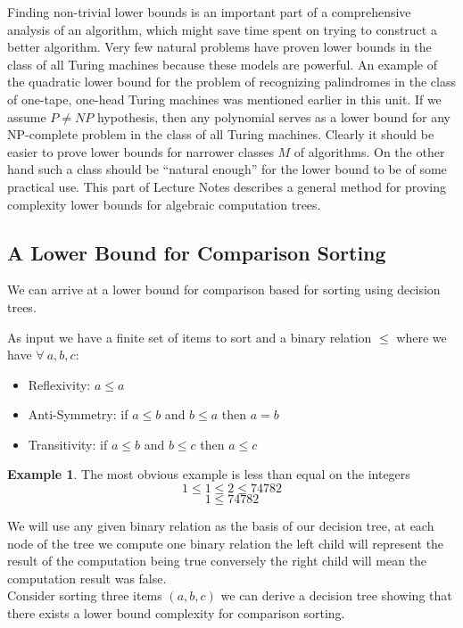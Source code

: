 \documentclass{article}
\theoremstyle{definition}
\newtheorem{example}{Example}[section]
\begin{document}
Finding non-trivial lower bounds is an important part of a comprehensive analysis of an algorithm,
which might save time spent on trying to construct a better algorithm.
Very few natural problems have proven lower bounds in the class of all Turing machines because these models are powerful.
An example of the quadratic lower bound for the problem of recognizing palindromes in the class of one-tape,
one-head Turing machines was mentioned earlier in this unit.
If we assume $P \neq NP$ hypothesis, then any polynomial serves as a lower bound for any NP-complete problem in the class of all Turing machines.
Clearly it should be easier to prove lower bounds for narrower classes $M$ of algorithms.
On the other hand such a class should be “natural enough” for the lower bound to be of some practical use.
This part of Lecture Notes describes a general method for proving complexity lower bounds for algebraic computation trees.

\subsection{A Lower Bound for Comparison Sorting}
We can arrive at a lower bound for comparison based for sorting using decision trees.

As input we have a finite set of items to sort
and a binary relation $\leq$ where we have $\forall\ a,b,c:$
\begin{itemize}
    \item Reflexivity: $a \leq a$
    \item Anti-Symmetry: if $a \leq b$ and $b \leq a$ then $a = b$
    \item Transitivity: if $a \leq b$ and $b \leq c$ then $a \leq c$
\end{itemize}

\begin{example}
The most obvious example is less than equal on the integers
$$1 \leq 1 \leq 2 \leq 74782$$
$$1 \leq 74782$$
\end{example}

We will use any given binary relation as the basis of our decision tree,
at each node of the tree we compute one binary relation
the left child will represent the result of the computation being true
conversely the right child will mean the computation result was false.
$$$$
Consider sorting three items $(a,b,c)$ we can derive a decision tree showing that
there exists a lower bound complexity for comparison sorting.
\end{document}
